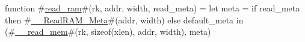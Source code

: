 function #\hyperref[sailRISCVzreadzyram]{read\_ram}#(rk, addr, width, read_meta) =
  let meta = if read_meta then #\hyperref[sailRISCVzzyzyReadRAMzyMeta]{\_\_ReadRAM\_Meta}#(addr, width) else default_meta in
  (#\hyperref[sailRISCVzzyzyreadzymem]{\_\_read\_mem}#(rk, sizeof(xlen), addr, width), meta)
